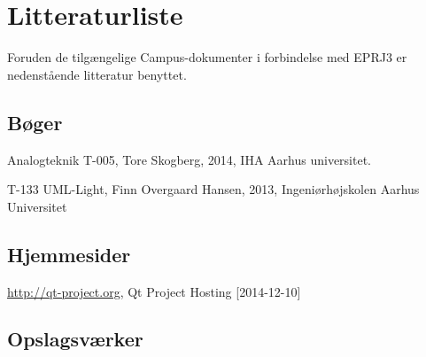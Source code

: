 \chapter{Litteraturliste}
Foruden de tilgængelige Campus-dokumenter i forbindelse med EPRJ3 er nedenstående litteratur benyttet. 

\section{Bøger}
Analogteknik T-005, Tore Skogberg, 2014, IHA Aarhus universitet.

T-133 UML-Light, Finn Overgaard Hansen, 2013, Ingeniørhøjskolen Aarhus Universitet

\section{Hjemmesider}

\url{http://qt-project.org}, Qt Project Hosting [2014-12-10]


\section{Opslagsværker}

